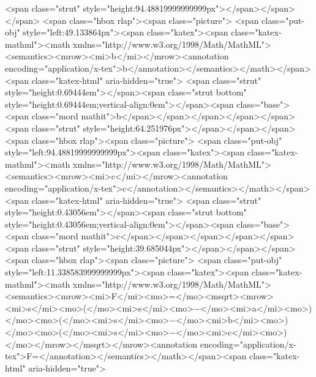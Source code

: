 <span class="strut" style="height:94.48819999999999px"></span></span></span> <span class="hbox rlap"><span class="picture">
<span class="put-obj" style="left:49.133864px"><span class="katex"><span class="katex-mathml"><math xmlns="http://www.w3.org/1998/Math/MathML"><semantics><mrow><mi>b</mi></mrow><annotation encoding="application/x-tex">b</annotation></semantics></math></span><span class="katex-html" aria-hidden="true">
<span class="strut" style="height:0.69444em"></span><span class="strut bottom" style="height:0.69444em;vertical-align:0em"></span><span class="base"><span class="mord mathit">b</span></span></span></span></span>
<span class="strut" style="height:64.251976px"></span></span></span> <span class="hbox rlap"><span class="picture">
<span class="put-obj" style="left:94.48819999999999px"><span class="katex"><span class="katex-mathml"><math xmlns="http://www.w3.org/1998/Math/MathML"><semantics><mrow><mi>c</mi></mrow><annotation encoding="application/x-tex">c</annotation></semantics></math></span><span class="katex-html" aria-hidden="true">
<span class="strut" style="height:0.43056em"></span><span class="strut bottom" style="height:0.43056em;vertical-align:0em"></span><span class="base"><span class="mord mathit">c</span></span></span></span></span>
<span class="strut" style="height:39.685044px"></span></span></span> <span class="hbox rlap"><span class="picture">
<span class="put-obj" style="left:11.338583999999999px"><span class="katex"><span class="katex-mathml"><math xmlns="http://www.w3.org/1998/Math/MathML"><semantics><mrow><mi>F</mi><mo>=</mo><msqrt><mrow><mi>s</mi><mo>(</mo><mi>s</mi><mo>−</mo><mi>a</mi><mo>)</mo><mo>(</mo><mi>s</mi><mo>−</mo><mi>b</mi><mo>)</mo><mo>(</mo><mi>s</mi><mo>−</mo><mi>c</mi><mo>)</mo></mrow></msqrt></mrow><annotation encoding="application/x-tex">F=</annotation></semantics></math></span><span class="katex-html" aria-hidden="true">
